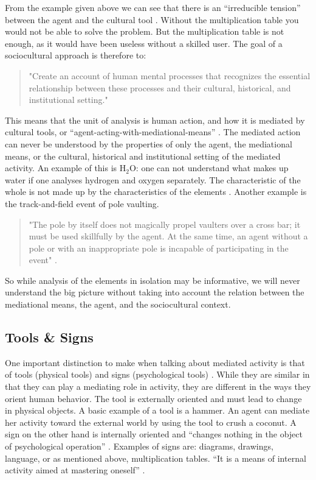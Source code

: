 From the example given above we can see that there is an “irreducible tension” between the agent and the cultural tool \citep{wertsch1998mind}. Without the multiplication table you would not be able to solve the problem. But the multiplication table is not enough, as it would have been useless without a skilled user. The goal of a sociocultural approach is therefore to: 

\begin{quote}
"Create an account of human mental processes that recognizes the essential relationship between these processes and their cultural, historical, and institutional setting."\citep{wertsch1998mind} 
\end{quote}

This means that the unit of analysis is human action, and how it is mediated by cultural tools, or “agent-acting-with-mediational-means” \citep[\citealp{wertsch1993sociocultural} cited in][]{wertsch1998mind}. The mediated action can never be understood by the properties of only the agent, the mediational means, or the cultural, historical and institutional setting of the mediated activity. An example of this is $\text{H}_2\text{O}$: one can not understand what makes up water if one analyses hydrogen and oxygen separately. The characteristic of the whole is not made up by the characteristics of the elements \citep{vygotskiui1978mind}. Another example is the track-and-field event of pole vaulting. 
\begin{quote}
"The pole by itself does not magically propel vaulters over a cross bar; it must be used skillfully by the agent. At the same time, an agent without a pole or with an inappropriate pole is incapable of participating in the event" \citep{wertsch1998mind}. 
\end{quote}
So while analysis of the elements in isolation may be informative, we will never understand the big picture without taking into account the relation between the mediational means, the agent, and the sociocultural context. 

\subsection{Tools \& Signs}
One important distinction to make when talking about mediated activity is that of tools (physical tools) and signs (psychological tools) \citep{vygotskiui1978mind}. While they are similar in that they can play a mediating role in activity, they are different in the ways they orient human behavior. The tool is externally oriented and must lead to change in physical objects. A basic example of a tool is a hammer. An agent can mediate her activity toward the external world by using the tool to crush a coconut. A sign on the other hand is internally oriented and “changes nothing in the object of psychological operation” \citep{vygotskiui1978mind}. Examples of signs are: diagrams, drawings, language, or as mentioned above, multiplication tables. “It is a means of internal activity aimed at mastering oneself” \citep{vygotskiui1978mind}. 

